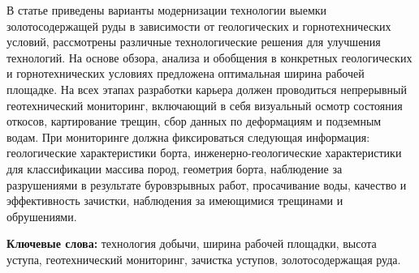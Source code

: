 В статье приведены варианты модернизации технологии выемки
золотосодержащей руды в зависимости от геологических и горнотехнических
условий, рассмотрены различные технологические решения для улучшения
технологий. На основе обзора, анализа и обобщения в конкретных
геологических и горнотехнических условиях предложена оптимальная ширина
рабочей площадке. На всех этапах разработки карьера должен проводиться
непрерывный геотехнический мониторинг, включающий в себя визуальный
осмотр состояния откосов, картирование трещин, сбор данных по
деформациям и подземным водам. При мониторинге должна фиксироваться
следующая информация: геологические характеристики борта,
инженерно-геологические характеристики для классификации массива пород,
геометрия борта, наблюдение за разрушениями в результате буровзрывных
работ, просачивание воды, качество и эффективность зачистки, наблюдения
за имеющимися трещинами и обрушениями.

{\bfseries Ключевые слова:} технология добычи, ширина рабочей площадки,
высота уступа, геотехнический мониторинг, зачистка уступов,
золотосодержащая руда.

